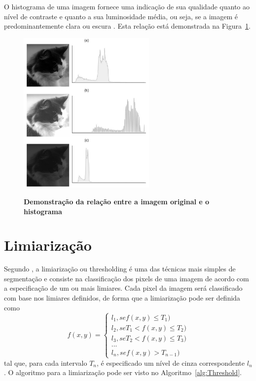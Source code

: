 \documentclass[12pt,oneside,a4paper,english,french,spanish,brazil,]{abntex2}
\begin{document}
O histograma de uma imagem fornece uma indicação de sua qualidade quanto ao nível de contraste e quanto a sua luminosidade média, ou seja, se a imagem é predominantemente clara ou escura \cite{conci:2003}. Esta relação está demonstrada na Figura~\ref{fig:PDI_Histograma_2}.

\begin{figure}[ht]
\centering
\caption{\textbf{Demonstração da relação entre a imagem original e o histograma}}
\includegraphics[width=0.6\textwidth]{imagens/PDI_Histograma_2.pdf}
\sourceAuthor
\label{fig:PDI_Histograma_2}
\end{figure}

\section{Limiarização}

Segundo \citet{pedrini:2008}, a limiarização ou thresholding é uma das técnicas mais simples de segmentação e consiste na classificação dos pixels de uma imagem de acordo com a especificação de um ou mais limiares. Cada pixel da imagem será classificado com base nos limiares definidos, de forma que a limiarização pode ser definida como \[f(x,y)=\left\{\begin{matrix} l_1, se f(x,y) \leq T_1) \\ l_2, se T_1 < f(x,y) \leq T_2)\\ l_3, se T_2 < f(x,y) \leq T_3)\\ ...\\ l_n, se f(x,y) > T_{n-1}) \end{matrix}\right.\] tal que, para cada intervalo \(T_n\), é especificado um nível de cinza correspondente \(l_n\). O algoritmo para a limiarização pode ser visto no Algoritmo~\ref{alg:Threshold}.
\end{document}
